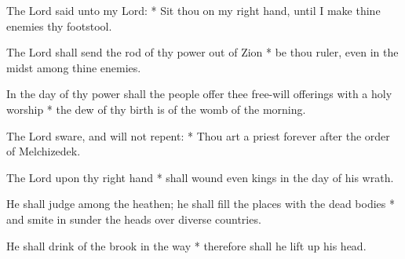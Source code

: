 \begin{multicols}{2}
	
	The Lord said unto my Lord: * Sit thou on my right hand, until I make thine enemies thy footstool.
	
	The Lord shall send the rod of thy power out of Zion * be thou ruler, even in the midst among thine enemies.
	
	In the day of thy power shall the people offer thee free-will offerings with a holy worship * the dew of thy birth is of the womb of the morning.
	
	The Lord sware, and will not repent: * Thou art a priest forever after the order of Melchizedek.
	
	The Lord upon thy right hand * shall wound even kings in the day of his wrath.
	
	He shall judge among the heathen; he shall fill the places with the dead bodies * and smite in sunder the heads over diverse countries.
	
	He shall drink of the brook in the way * therefore shall he lift up his head.
	
	\gloria{}
\end{multicols}